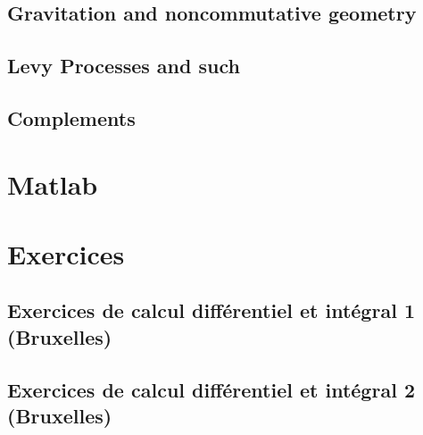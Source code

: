 \chapter{Gravitation and noncommutative geometry}


\chapter{Levy Processes and such}


\chapter{Complements}









\part{Matlab}




\part{Exercices} 





\chapter{Exercices de calcul différentiel et intégral 1 (Bruxelles)}


 
\chapter{Exercices de calcul différentiel et intégral 2 (Bruxelles)}






 


